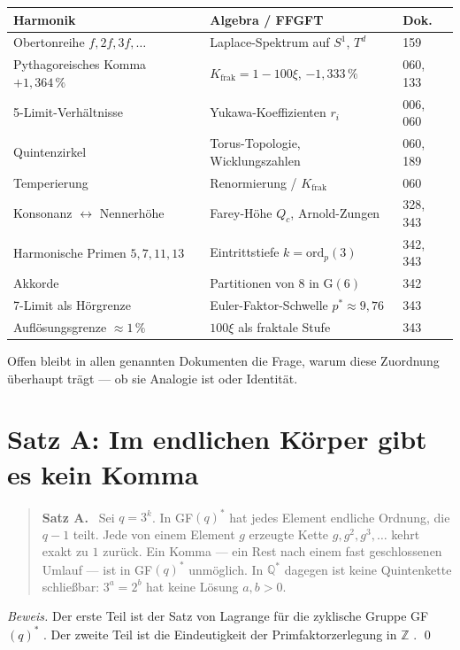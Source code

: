 \begin{center}
\begin{tabular}{@{}lll@{}}
\toprule
Harmonik & Algebra / FFGFT & Dok. \\
\midrule
Obertonreihe $f, 2f, 3f,\dots$ & Laplace-Spektrum auf $S^1$, $T^d$ & 159 \\
Pythagoreisches Komma $+1{,}364\,\%$ & $K_\text{frak}=1-100\xi$, $-1{,}333\,\%$ & 060, 133 \\
5-Limit-Verhältnisse & Yukawa-Koeffizienten $r_i$ & 006, 060 \\
Quintenzirkel & Torus-Topologie, Wicklungszahlen & 060, 189 \\
Temperierung & Renormierung / $K_\text{frak}$ & 060 \\
Konsonanz $\leftrightarrow$ Nennerhöhe & Farey-Höhe $Q_c$, Arnold-Zungen & 328, 343 \\
Harmonische Primen $5,7,11,13$ & Eintrittstiefe $k=\mathrm{ord}_p(3)$ & 342, 343 \\
Akkorde & Partitionen von 8 in G$(6)$ & 342 \\
7-Limit als Hörgrenze & Euler-Faktor-Schwelle $p^*\approx9{,}76$ & 343 \\
Auflösungsgrenze $\approx1\,\%$ & $100\xi$ als fraktale Stufe & 343 \\
\bottomrule
\end{tabular}
\end{center}

Offen bleibt in allen genannten Dokumenten die Frage, warum diese
Zuordnung überhaupt trägt --- ob sie Analogie ist oder Identität.

\section{Satz A: Im endlichen Körper gibt es kein Komma}

\begin{quote}
\textbf{Satz A.} \BM\ Sei $q=3^k$. In GF$(q)^*$ hat jedes Element
endliche Ordnung, die $q-1$ teilt. Jede von einem Element $g$ erzeugte
Kette $g, g^2, g^3,\dots$ kehrt exakt zu $1$ zurück. Ein Komma ---
ein Rest nach einem fast geschlossenen Umlauf --- ist in GF$(q)^*$
unmöglich. In $\mathbb{Q}^*$ dagegen ist keine Quintenkette
schließbar: $3^a=2^b$ hat keine Lösung $a,b>0$.
\end{quote}

\emph{Beweis.} Der erste Teil ist der Satz von Lagrange für die zyklische
Gruppe GF$(q)^*$ \EM. Der zweite Teil ist die Eindeutigkeit der
Primfaktorzerlegung in $\mathbb{Z}$ \EM. \qed

